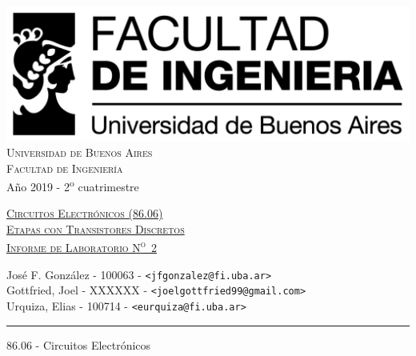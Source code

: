 \documentclass[a4paper, 10pt, spanish]{article}
\begin{document}
\marginsize{2cm}{2cm}{2cm}{2cm}
%
%
\begin{titlepage}

\thispagestyle{empty}

\begin{center}
\includegraphics[scale=0.3]{lhead.png}\\
\large{\textsc{Universidad de Buenos Aires}}\\
\large{\textsc{Facultad de Ingeniería}}\\
\small{Año 2019 - 2\textsuperscript{o} cuatrimestre}
\end{center}

\vfill

\begin{center} %
\Large{\underline{\textsc{Circuitos Electrónicos (86.06)}}}\\ \vspace{0.5cm}
\Large{\underline{\textsc{Etapas con Transistores Discretos}}}\\ \vspace{0.5cm}
\Large{\underline{\textsc{Informe de Laboratorio N\textsuperscript{o}~2}}}
\end{center}

\vfill

\begin{center}
\large{José F. González - 100063 - \footnotesize{\verb!<jfgonzalez@fi.uba.ar>!}}\\ \vspace{0.25cm}
\large{Gottfried, Joel - XXXXXX - \footnotesize{\verb!<joelgottfried99@gmail.com>!}}\\\vspace{0.25cm}
\large{Urquiza, Elias - 100714 - \footnotesize{\verb!<eurquiza@fi.uba.ar>!}}\\
\end{center}

\vfill

\hrule
\vspace{0.2cm}

\noindent\small{86.06 - Circuitos Electrónicos \hfill }

\end{titlepage}
\end{document}
